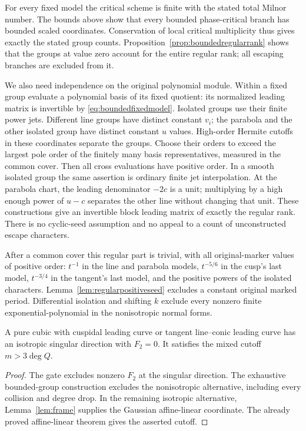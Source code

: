 For every fixed model the critical scheme is finite with the
stated total Milnor number. The bounds above show that every
bounded phase-critical branch has bounded scaled coordinates.
Conservation of local critical multiplicity thus gives exactly
the stated group counts. Proposition~\ref{prop:boundedregularrank}
shows that the groups at value zero account for the entire
regular rank; all escaping branches are excluded from it.

We also need independence on the original polynomial module.
Within a fixed group evaluate a polynomial basis of its fixed
quotient: its normalized leading matrix is invertible by
\eqref{eq:boundedfixedmodel}. Isolated groups use their finite
power jets. Different line groups have distinct constant $v_i$;
the parabola and the other isolated group have distinct constant
$u$ values. High-order Hermite cutoffs in these coordinates
separate the groups. Choose their orders to exceed the largest pole order of the
finitely many basis representatives, measured in the common cover.
Then all cross evaluations have positive order. In a smooth
isolated group the same assertion is ordinary finite jet
interpolation. At the parabola chart, the leading denominator
$-2c$ is a unit; multiplying by a high enough power of
$u-c$ separates the other line without changing that unit.
These constructions give an invertible block leading matrix
of exactly the regular rank. There is no cyclic-seed assumption
and no appeal to a count of unconstructed escape characters.

After a common cover this regular part is trivial, with all
original-marker values of positive order: $t^{-1}$ in the
line and parabola models, $t^{-5/6}$ in the cusp's last model,
$t^{-3/4}$ in the tangent's last model, and the positive powers
of the isolated characters. Lemma~\ref{lem:regularpositiveseed}
excludes a constant original marked period. Differential
isolation and shifting $k$ exclude every nonzero finite
exponential-polynomial in the nonisotropic normal forms.

\begin{proposition}\label{prop:cusptangentcomplete}
A pure cubic with cuspidal leading curve or tangent line--conic
leading curve has an isotropic singular direction with $F_2=0$.
It satisfies the mixed cutoff $m>3\deg Q$.
\end{proposition}
\begin{proof}
The gate excludes nonzero $F_2$ at the singular direction.
The exhaustive bounded-group construction excludes the
nonisotropic alternative, including every collision and
degree drop. In the remaining isotropic alternative,
Lemma~\ref{lem:frame} supplies the Gaussian affine-linear
coordinate. The already proved affine-linear theorem gives
the asserted cutoff.
\end{proof}
